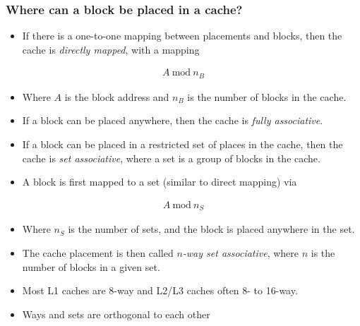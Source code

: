 \documentclass[11pt, a4paper]{article}
\theoremstyle{definition}
\theoremstyle{remark}
\begin{document}
\subsubsection{Where can a block be placed in a cache?}
\begin{itemize}
  \item If there is a one-to-one mapping between placements and blocks, then the cache is \textit{directly mapped}, with a mapping 
\end{itemize}
\begin{align}
  A\ \text{mod}\ n_B
\end{align}
\begin{itemize}
  \item Where $A$ is the block address and $n_B$ is the number of blocks in the cache.
  \item If a block can be placed anywhere, then the cache is \textit{fully associative}.
  \item If a block can be placed in a restricted set of places in the cache, then the cache is \textit{set associative}, where a set is a group of blocks in the cache.
  \item A block is first mapped to a set (similar to direct mapping) via 
\end{itemize}
\begin{align}
  A\ \text{mod}\ n_S
\end{align}
\begin{itemize}
  \item Where $n_S$ is the number of sets, and the block is placed anywhere in the set. 
  \item The cache placement is then called $n$\textit{-way set associative}, where $n$ is the number of blocks in a given set.
  \item Most L1 caches are 8-way and L2/L3 caches often 8- to 16-way.
  \item Ways and sets are orthogonal to each other
\end{itemize}
\end{document}
